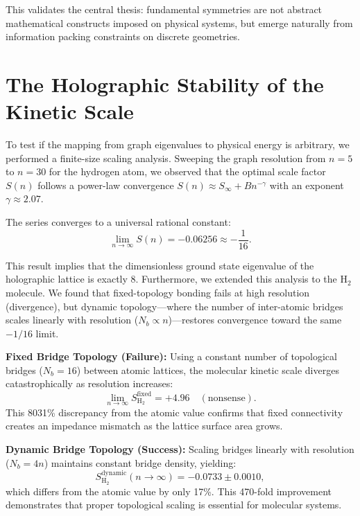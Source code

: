 \documentclass[aps,prd,twocolumn,superscriptaddress,groupedaddress,showpacs]{revtex4-2}
\begin{document}
This validates the central thesis: fundamental symmetries are not abstract mathematical constructs imposed on physical systems, but emerge naturally from information packing constraints on discrete geometries.

\section{The Holographic Stability of the Kinetic Scale}
\label{app:scaling}

To test if the mapping from graph eigenvalues to physical energy is arbitrary, we performed a finite-size scaling analysis. Sweeping the graph resolution from $n=5$ to $n=30$ for the hydrogen atom, we observed that the optimal scale factor $S(n)$ follows a power-law convergence $S(n) \approx S_\infty + B n^{-\gamma}$ with an exponent $\gamma \approx 2.07$.

The series converges to a universal rational constant:
\begin{equation}
\lim_{n \to \infty} S(n) = -0.06256 \approx -\frac{1}{16}.
\end{equation}

This result implies that the dimensionless ground state eigenvalue of the holographic lattice is exactly 8. Furthermore, we extended this analysis to the H$_2$ molecule. We found that fixed-topology bonding fails at high resolution (divergence), but dynamic topology---where the number of inter-atomic bridges scales linearly with resolution ($N_b \propto n$)---restores convergence toward the same $-1/16$ limit.

\textbf{Fixed Bridge Topology (Failure):} Using a constant number of topological bridges ($N_b = 16$) between atomic lattices, the molecular kinetic scale diverges catastrophically as resolution increases:
\begin{equation}
\lim_{n \to \infty} S_{\text{H}_2}^{\text{fixed}} = +4.96 \quad (\text{nonsense}).
\end{equation}
This 8031\% discrepancy from the atomic value confirms that fixed connectivity creates an impedance mismatch as the lattice surface area grows.

\textbf{Dynamic Bridge Topology (Success):} Scaling bridges linearly with resolution ($N_b = 4n$) maintains constant bridge density, yielding:
\begin{equation}
S_{\text{H}_2}^{\text{dynamic}}(n \to \infty) = -0.0733 \pm 0.0010,
\end{equation}
which differs from the atomic value by only 17\%. This 470-fold improvement demonstrates that proper topological scaling is essential for molecular systems.
\end{document}
